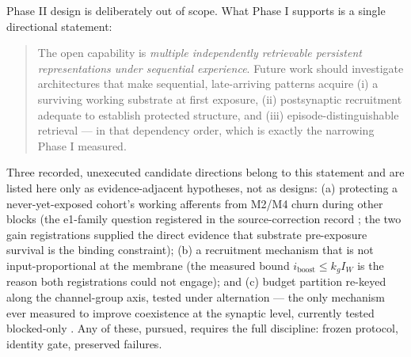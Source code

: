 Phase II design is deliberately out of scope. What Phase I supports is
a single directional statement:

\begin{quote}
The open capability is \emph{multiple independently retrievable
persistent representations under sequential experience}. Future work
should investigate architectures that make sequential, late-arriving
patterns acquire (i) a surviving working substrate at first exposure,
(ii) postsynaptic recruitment adequate to establish protected
structure, and (iii) episode-distinguishable retrieval --- in that
dependency order, which is exactly the narrowing Phase I measured.
\end{quote}

Three recorded, unexecuted candidate directions belong to this
statement and are listed here only as evidence-adjacent hypotheses,
not as designs: (a) protecting a never-yet-exposed cohort's working
afferents from M2/M4 churn during other blocks (the e1-family question
registered in the source-correction record \cite{fec}; the two gain
registrations supplied the direct evidence that substrate
pre-exposure survival is the binding constraint); (b) a
recruitment mechanism that is not input-proportional at the membrane
(the measured bound \(i_{\mathrm{boost}} \le k_g I_W\) is the reason
both registrations could not engage); and (c) budget partition
re-keyed along the channel-group axis, tested under alternation ---
the only mechanism ever measured to improve coexistence at the
synaptic level, currently tested blocked-only \cite{synmem}. Any of
these, pursued, requires the full discipline: frozen protocol,
identity gate, preserved failures.